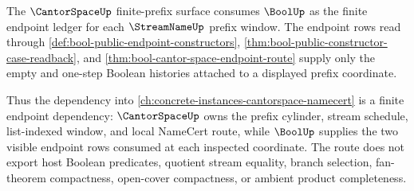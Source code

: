 The $\CantorSpaceUp$ finite-prefix surface consumes $\BoolUp$ as the finite
endpoint ledger for each $\StreamNameUp$ prefix window. The endpoint rows read
through \autoref{def:bool-public-endpoint-constructors},
\autoref{thm:bool-public-constructor-case-readback}, and
\autoref{thm:bool-cantor-space-endpoint-route} supply only the empty and
one-step Boolean histories attached to a displayed prefix coordinate.

Thus the dependency into \autoref{ch:concrete-instances-cantorspace-namecert}
is a finite endpoint dependency: $\CantorSpaceUp$ owns the prefix cylinder,
stream schedule, list-indexed window, and local NameCert route, while
$\BoolUp$ supplies the two visible endpoint rows consumed at each inspected
coordinate. The route does not export host Boolean predicates, quotient stream
equality, branch selection, fan-theorem compactness, open-cover compactness, or
ambient product completeness.
